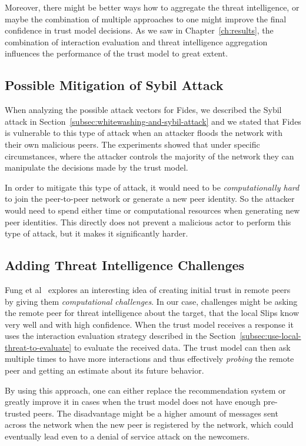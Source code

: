 Moreover, there might be better ways how to aggregate the threat intelligence, or maybe the combination of multiple approaches to one might improve the final confidence in trust model decisions.
As we saw in Chapter~\ref{ch:results}, the combination of interaction evaluation and threat intelligence aggregation influences the performance of the trust model to great extent.

\subsection{Possible Mitigation of Sybil Attack}
\label{subsec:possible-mittigation-of-sybil-attack}
When analyzing the possible attack vectors for Fides, we described the Sybil attack in Section~\ref{subsec:whitewashing-and-sybil-attack} and we stated that Fides is vulnerable to this type of attack when an attacker floods the network with their own malicious peers.
The experiments showed that under specific circumstances, where the attacker controls the majority of the network they can manipulate the decisions made by the trust model.

In order to mitigate this type of attack, it would need to be \textit{computationally hard} to join the peer-to-peer network or generate a new peer identity.
So the attacker would need to spend either time or computational resources when generating new peer identities.
This directly does not prevent a malicious actor to perform this type of attack, but it makes it significantly harder.

\subsection{Adding Threat Intelligence Challenges}
\label{subsec:adding-threat-intelligence-challenges}
Fung et al~\cite{fung2008trust} explores an interesting idea of creating initial trust in remote peers by giving them \textit{computational challenges}.
In our case, challenges might be asking the remote peer for threat intelligence about the target, that the local Slips know very well and with high confidence.
When the trust model receives a response it uses the interaction evaluation strategy described in the Section~\ref{subsec:use-local-threat-to-evaluate} to evaluate the received data.
The trust model can then ask multiple times to have more interactions and thus effectively \textit{probing} the remote peer and getting an estimate about its future behavior.

By using this approach, one can either replace the recommendation system or greatly improve it in cases when the trust model does not have enough pre-trusted peers.
The disadvantage might be a higher amount of messages sent across the network when the new peer is registered by the network, which could eventually lead even to a denial of service attack on the newcomers. 

